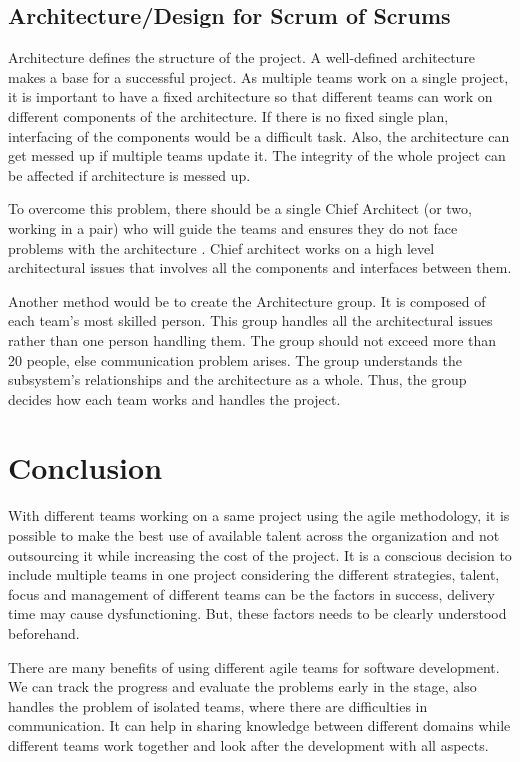 \documentclass[sigconf]{acmart}
\begin{document}
\subsection{Architecture/Design for Scrum of Scrums }
Architecture defines the structure of the project. A well-defined architecture makes a base for a successful project. As multiple teams work on a single project, it is important to have a fixed architecture so that different teams can work on different components of the architecture. If there is no fixed single plan, interfacing of the components would be a difficult task. Also, the architecture can get messed up if multiple teams update it. The integrity of the whole project can be affected if architecture is messed up.


To overcome this problem, there should be a single Chief Architect (or two, working in a pair) who will guide the teams and ensures they do not face problems with the architecture \cite{HenrikK}. Chief architect works on a high level architectural issues that involves all the components and interfaces between them. 


Another method would be to create the Architecture group. It is composed of each team's most skilled person. This group handles all the architectural issues rather than one person handling them. The group should not exceed more than 20 people, else communication problem arises. The group understands the subsystem's relationships and the architecture as a whole. Thus, the group decides how each team works and handles the project. 


\section{Conclusion}
With different teams working on a same project using the agile methodology, it is possible to make the best use of available talent across the organization and not outsourcing it while increasing the cost of the project. It is a conscious decision to include multiple teams in one project considering the different strategies, talent, focus and management of different teams can be the factors in success, delivery time may cause dysfunctioning. But, these factors needs to be clearly understood beforehand.

There are many benefits of using different agile teams for software development. We can track the progress and evaluate the problems early in the stage, also handles the problem of isolated teams, where there are difficulties in communication. It can help in sharing knowledge between different domains while different teams work together and look after the development with all aspects.
\end{document}
